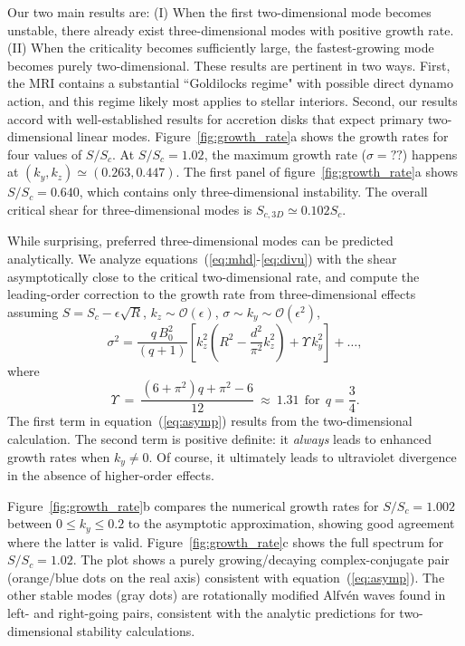 \documentclass[aps,prl,reprint,superscriptaddress]{revtex4-1}
\newcommand{\SSC}{S/S_{c}}
\begin{document}
Our two main results are: (I) When the first two-dimensional mode becomes unstable, there already exist three-dimensional modes with positive growth rate. (II) When the criticality becomes sufficiently large, the fastest-growing mode becomes purely two-dimensional. These results are pertinent in two ways. First, the MRI contains a substantial ``Goldilocks regime" with possible direct dynamo action, and this regime likely most applies to stellar interiors. Second, our results accord with well-established results for accretion disks that expect primary two-dimensional linear modes.
Figure~\ref{fig:growth_rate}a shows the growth rates for four values of $\SSC$. 
At $\SSC = 1.02$, the maximum growth rate ($\sigma = ??$) happens at $(k_y, k_z) \simeq (0.263, 0.447)$.
The first panel of figure~\ref{fig:growth_rate}a shows $\SSC = 0.640$, which contains only three-dimensional instability.
The overall critical shear for three-dimensional modes is $S_{c,3D} \simeq 0.102 S_c$.

While surprising, preferred three-dimensional modes can be predicted analytically.
We analyze equations~(\ref{eq:mhd}-\ref{eq:divu}) with the shear asymptotically close to the critical two-dimensional rate, and compute the leading-order correction to the growth rate from three-dimensional effects assuming $S = S_c - \epsilon \sqrt{R}$, $k_{z} \sim \mathcal{O}(\epsilon)$, $\sigma \sim k_{y} \sim \mathcal{O}(\epsilon^{2})$, 
\begin{equation}
  \label{eq:asymp}
\sigma^{2} =  \frac{q\,B_{0}^{2}}{(q+1)} \left[ k_z^2 \left( R^{2} - \frac{d^2}{\pi^{2}} k_z^2 \right)  +  \Upsilon \, k_{y}^{2}  \right] +  \ldots,
\end{equation}
where
\begin{equation}
\Upsilon \ = \ \frac{\left(6+\pi ^2\right) q+\pi^2-6}{12 }\  \approx \ 1.31 \ \  \text{for}  \ \  q = \frac{3}{4}.
\end{equation}
The first term in equation~(\ref{eq:asymp}) results from the two-dimensional calculation.
The second term is positive definite: it \emph{always} leads to enhanced growth rates when $k_y \neq 0$.
Of course, it ultimately leads to ultraviolet divergence in the absence of higher-order effects.

Figure~\ref{fig:growth_rate}b compares the numerical growth rates for $\SSC=1.002$ between $0 \le k_y \le 0.2$ to the asymptotic approximation, showing good agreement where the latter is valid.
Figure~\ref{fig:growth_rate}c shows the full spectrum for $\SSC = 1.02$.
The plot shows a purely growing/decaying complex-conjugate pair (orange/blue dots on the real axis) consistent with equation~(\ref{eq:asymp}).
The other stable modes (gray dots) are rotationally modified Alfv\'{e}n waves found in left- and right-going pairs, consistent with the analytic predictions for two-dimensional stability calculations.
\end{document}
